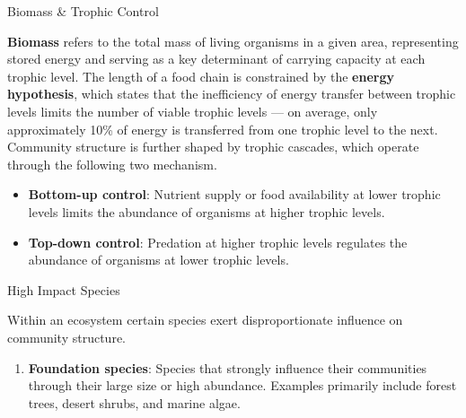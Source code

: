 \documentclass[10pt]{article}
\begin{document}
    \begin{core}{Biomass \& Trophic Control}

      \textbf{Biomass} refers to the total mass of living organisms in a given area, representing stored energy and serving as a key determinant of carrying capacity at each trophic level. The length of a food chain is constrained by the \textbf{energy hypothesis}, which states that the inefficiency of energy transfer between trophic levels limits the number of viable trophic levels --- on average, only approximately 10\% of energy is transferred from one trophic level to the next. Community structure is further shaped by trophic cascades, which operate through the following two mechanism.

      \begin{itemize}

        \item \textbf{Bottom-up control}: Nutrient supply or food availability at lower trophic levels limits the abundance of organisms at higher trophic levels.

        \item \textbf{Top-down control}: Predation at higher trophic levels regulates the abundance of organisms at lower trophic levels.

      \end{itemize}

    \end{core}

    \begin{core}{High Impact Species}

      Within an ecosystem certain species exert disproportionate influence on community structure.

      \begin{enumerate}

        \item \textbf{Foundation species}: Species that strongly influence their communities through their large size or high abundance. Examples primarily include forest trees, desert shrubs, and marine algae.



      \end{enumerate}

    \end{core}
\end{document}
